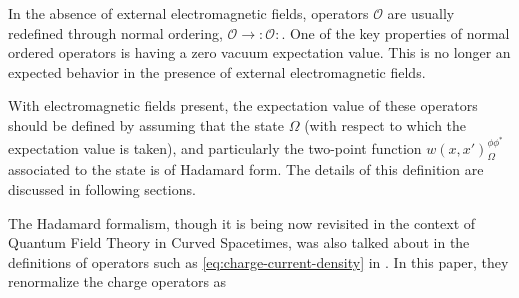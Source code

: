 In the absence of external electromagnetic fields, operators $\mathcal{O}$ are usually redefined through normal ordering, $\mathcal{O} \to :\mathcal{O}:$. One of the key properties of normal ordered operators is having a zero vacuum expectation value. This is no longer an expected behavior in the presence of external electromagnetic fields.

With electromagnetic fields present, the expectation value of these operators should be defined by assuming that the state $\Omega$ (with respect to which the expectation value is taken), and particularly the two-point function $w(x, x')^{\phi \phi^*}_\Omega$ associated to the state is of Hadamard form. The details of this definition are discussed in following sections. 

The Hadamard formalism, though it is being now revisited in the context of Quantum Field Theory in Curved Spacetimes, was also talked about in the definitions of operators such as \ref{eq:charge-current-density} in \cite{Dirac1934}. In this paper, they renormalize the charge operators as 